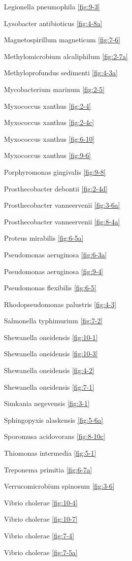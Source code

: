\documentclass[]{tufte-book}
\begin{document}
Legionella pneumophila \ref{fig:9-3}

Lysobacter antibioticus \ref{fig:4-8a}

Magnetospirillum magneticum \ref{fig:7-6}

Methylomicrobium alcaliphilum \ref{fig:2-7a}

Methyloprofundus sedimenti \ref{fig:4-3a}

Mycobacterium marinum \ref{fig:2-5}

Myxococcus xanthus \ref{fig:2-4}

Myxococcus xanthus \ref{fig:2-4c}

Myxococcus xanthus \ref{fig:6-10}

Myxococcus xanthus \ref{fig:9-6}

Porphyromonas gingivalis \ref{fig:9-8}

Prosthecobacter debontii \ref{fig:2-4d}

Prosthecobacter vanneervenii \ref{fig:3-6a}

Prosthecobacter vanneervenii \ref{fig:8-4a}

Proteus mirabilis \ref{fig:6-5a}

Pseudomonas aeruginosa \ref{fig:6-3a}

Pseudomonas aeruginosa \ref{fig:9-4}

Pseudomonas flexibilis \ref{fig:6-5}

Rhodopseudomonas palustris \ref{fig:4-3}

Salmonella typhimurium \ref{fig:7-2}

Shewanella oneidensis \ref{fig:10-1}

Shewanella oneidensis \ref{fig:10-3}

Shewanella oneidensis \ref{fig:4-2}

Shewanella oneidensis \ref{fig:7-1}

Simkania negevensis \ref{fig:3-1}

Sphingopyxis alaskensis \ref{fig:5-6a}

Sporomusa acidovorans \ref{fig:8-10c}

Thiomonas intermedia \ref{fig:5-1}

Treponema primitia \ref{fig:6-7a}

Verrucomicrobium spinosum \ref{fig:3-6}

Vibrio cholerae \ref{fig:10-4}

Vibrio cholerae \ref{fig:10-7}

Vibrio cholerae \ref{fig:7-4}

Vibrio cholerae \ref{fig:7-5a}
\end{document}
